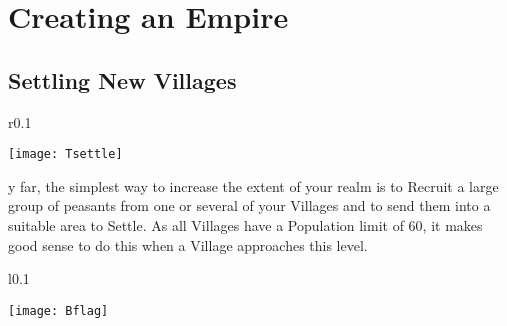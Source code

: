
\chapter{Creating an Empire}


\section{Settling New Villages}


\begin{wrapfigure}{r}{0.1\textwidth}
    \vspace{-20pt}
    \begin{center}
        \texttt{[image: Tsettle]}
    \end{center}
    \vspace{-20pt}
\end{wrapfigure}

y far, the simplest way to increase the extent of your realm is to Recruit a large group of peasants from one or several of your Villages and to send them into a suitable area to Settle. As all Villages have a Population limit of 60, it makes good sense to do this when a Village approaches this level.

\begin{wrapfigure}{l}{0.1\textwidth}
    \vspace{-20pt}
    \begin{center}
        \texttt{[image: Bflag]} %
    \end{center}
    \vspace{-20pt}
\end{wrapfigure}


